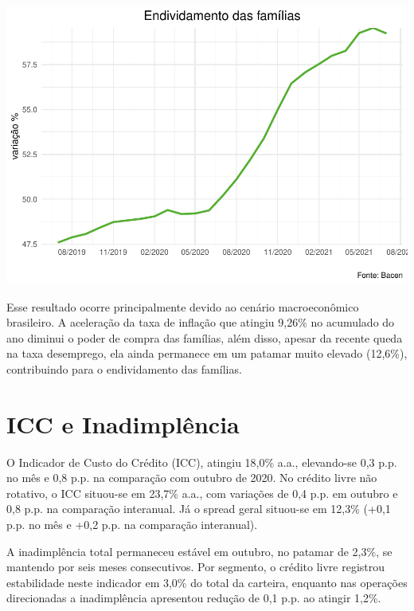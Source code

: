 \documentclass[100,a4paperpaper,]{article}
\begin{document}
\includegraphics{credito_files/figure-latex/endividamento das familias br-1.pdf}

Esse resultado ocorre principalmente devido ao cenário macroeconômico
brasileiro. A aceleração da taxa de inflação que atingiu 9,26\% no
acumulado do ano diminui o poder de compra das famílias, além disso,
apesar da recente queda na taxa desemprego, ela ainda permanece em um
patamar muito elevado (12,6\%), contribuindo para o endividamento das
famílias. \newpage

\section{ICC e Inadimplência} 
\vspace{0,20cm}

O Indicador de Custo do Crédito (ICC), atingiu 18,0\% a.a., elevando-se
0,3 p.p. no mês e 0,8 p.p. na comparação com outubro de 2020. No crédito
livre não rotativo, o ICC situou-se em 23,7\% a.a., com variações de 0,4
p.p. em outubro e 0,8 p.p. na comparação interanual. Já o spread geral
situou-se em 12,3\% (+0,1 p.p. no mês e +0,2 p.p. na comparação
interanual).

A inadimplência total permaneceu estável em outubro, no patamar de
2,3\%, se mantendo por seis meses consecutivos. Por segmento, o crédito
livre registrou estabilidade neste indicador em 3,0\% do total da
carteira, enquanto nas operações direcionadas a inadimplência apresentou
redução de 0,1 p.p. ao atingir 1,2\%.
\end{document}
